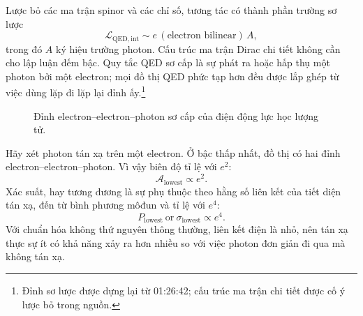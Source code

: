 Lược bỏ các ma trận spinor và các chỉ số, tương tác có thành phần trường sơ lược
\begin{equation}
\mathcal{L}_{\mathrm{QED,int}}
\sim e\,(\text{electron bilinear})\,A,
\end{equation}
trong đó \(A\) ký hiệu trường photon. Cấu trúc ma trận Dirac chi tiết không cần cho lập luận đếm bậc. Quy tắc QED sơ cấp là sự phát ra hoặc hấp thụ một photon bởi một electron; mọi đồ thị QED phức tạp hơn đều được lắp ghép từ việc dùng lặp đi lặp lại đỉnh ấy.\footnote{Đỉnh sơ lược được dựng lại từ 01:26:42; cấu trúc ma trận chi tiết được cố ý lược bỏ trong nguồn.}

\begin{figure}[htbp]
\centering
{}
\caption{Đỉnh electron--electron--photon sơ cấp của điện động lực học lượng tử.}
\end{figure}

\begin{classroomqa}
\end{classroomqa}

\begin{classroomqa}
\end{classroomqa}

Hãy xét photon tán xạ trên một electron. Ở bậc thấp nhất, đồ thị có hai đỉnh electron--electron--photon. Vì vậy biên độ tỉ lệ với \(e^2\):
\begin{equation}
\mathcal{A}_{\mathrm{lowest}}\propto e^2.
\end{equation}
Xác suất, hay tương đương là sự phụ thuộc theo hằng số liên kết của tiết diện tán xạ, đến từ bình phương môđun và tỉ lệ với \(e^4\):
\begin{equation}
P_{\mathrm{lowest}}\ \text{or}\ \sigma_{\mathrm{lowest}}
\propto e^4.
\end{equation}
Với chuẩn hóa không thứ nguyên thông thường, liên kết điện là nhỏ, nên tán xạ thực sự ít có khả năng xảy ra hơn nhiều so với việc photon đơn giản đi qua mà không tán xạ.

